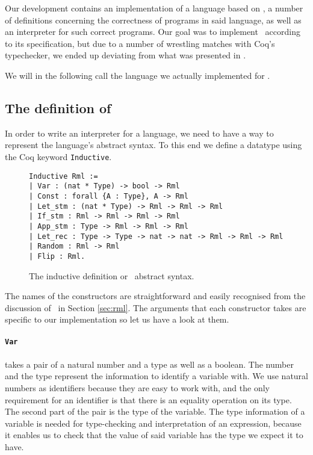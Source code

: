 \documentclass[11pt, leqno, titlepage]{article}
\def\coqe{\lstinline[language=Coq, basicstyle=\small]}
\theoremstyle{definition}
\begin{document}
Our development contains an implementation of a language based on \rml, a number of
definitions concerning the correctness of programs in said language, as well as an
interpreter for such correct programs. Our goal was to implement \rml\ according to
its specification, but due to a number of wrestling matches with Coq's typechecker,
we ended up deviating from what was presented in \cite{rml-paper}.

We will in the following call the language we actually implemented for \rmlx.

\subsection{The definition of \rmlx}
\label{sec:rmlx}

In order to write an interpreter for a language, we need to have a way to represent
the language's abstract syntax. To this end we define a datatype using the Coq
keyword \coqe{Inductive}. 

\begin{figure}[h]
  \centering
  \begin{minipage}{0.8\linewidth}
    \begin{lstlisting}[language=coq]
Inductive Rml :=
| Var : (nat * Type) -> bool -> Rml 
| Const : forall {A : Type}, A -> Rml
| Let_stm : (nat * Type) -> Rml -> Rml -> Rml
| If_stm : Rml -> Rml -> Rml -> Rml
| App_stm : Type -> Rml -> Rml -> Rml
| Let_rec : Type -> Type -> nat -> nat -> Rml -> Rml -> Rml
| Random : Rml -> Rml
| Flip : Rml.
    \end{lstlisting}
  \end{minipage}
  \caption{The inductive definition or \rmlx\ abstract syntax.}
  \label{fig:rmlx}
\end{figure}


The names of the constructors are straightforward and easily recognised from the
discussion of \rml\ in Section \ref{sec:rml}. The arguments that each constructor
takes are specific to our implementation so let us have a look at them.

\paragraph{\coqe{Var}} takes a pair of a natural number and a type as well as a boolean. 
The number and the type represent the information to identify a variable with. We use
natural numbers as identifiers because they are easy to work with, and the only
requirement for an identifier is that there is an equality operation on its type. The
second part of the pair is the type of the variable. The type information of a
variable is needed for type-checking and interpretation of an expression, because it
enables us to check that the value of said variable has the type we expect it to
have.
\end{document}
